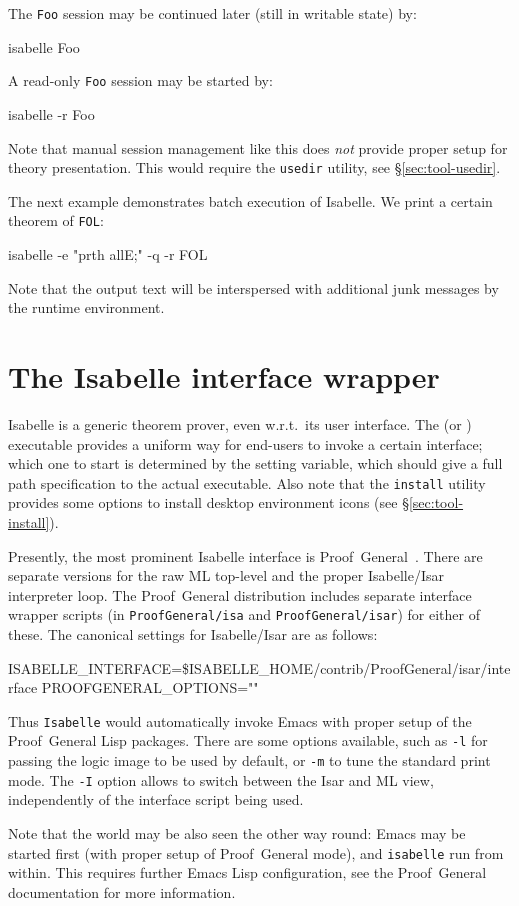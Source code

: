 The \texttt{Foo} session may be continued later (still in writable
state) by:
\begin{ttbox}
isabelle Foo
\end{ttbox}
A read-only \texttt{Foo} session may be started by:
\begin{ttbox}
isabelle -r Foo
\end{ttbox}

\medskip Note that manual session management like this does \emph{not} provide
proper setup for theory presentation.  This would require the \texttt{usedir}
utility, see \S\ref{sec:tool-usedir}.

\bigskip The next example demonstrates batch execution of Isabelle. We print a
certain theorem of \texttt{FOL}:
\begin{ttbox}
isabelle -e "prth allE;" -q -r FOL
\end{ttbox}
Note that the output text will be interspersed with additional junk messages
by the {\ML} runtime environment.


\section{The Isabelle interface wrapper}\label{sec:interface}

Isabelle is a generic theorem prover, even w.r.t.\ its user interface.  The
 (or ) executable provides a
uniform way for end-users to invoke a certain interface; which one to start is
determined by the  setting variable, which should
give a full path specification to the actual executable.  Also note that the
\texttt{install} utility provides some options to install desktop environment
icons (see \S\ref{sec:tool-install}).

Presently, the most prominent Isabelle interface is
Proof~General~\cite{proofgeneral}.  There
are separate versions for the raw ML top-level and the proper Isabelle/Isar
interpreter loop.  The Proof~General distribution includes separate interface
wrapper scripts (in \texttt{ProofGeneral/isa} and \texttt{ProofGeneral/isar})
for either of these.  The canonical settings for Isabelle/Isar are as follows:
\begin{ttbox}
ISABELLE_INTERFACE=\$ISABELLE_HOME/contrib/ProofGeneral/isar/interface
PROOFGENERAL_OPTIONS=""
\end{ttbox}
Thus \texttt{Isabelle} would automatically invoke Emacs with proper setup of
the Proof~General Lisp packages.  There are some options available, such as
\texttt{-l} for passing the logic image to be used by default, or \texttt{-m}
to tune the standard print mode.  The \texttt{-I} option allows to switch
between the Isar and ML view, independently of the interface script being
used.
  
\medskip Note that the world may be also seen the other way round: Emacs may
be started first (with proper setup of Proof~General mode), and
\texttt{isabelle} run from within.  This requires further Emacs Lisp
configuration, see the Proof~General documentation \cite{proofgeneral} for
more information.

